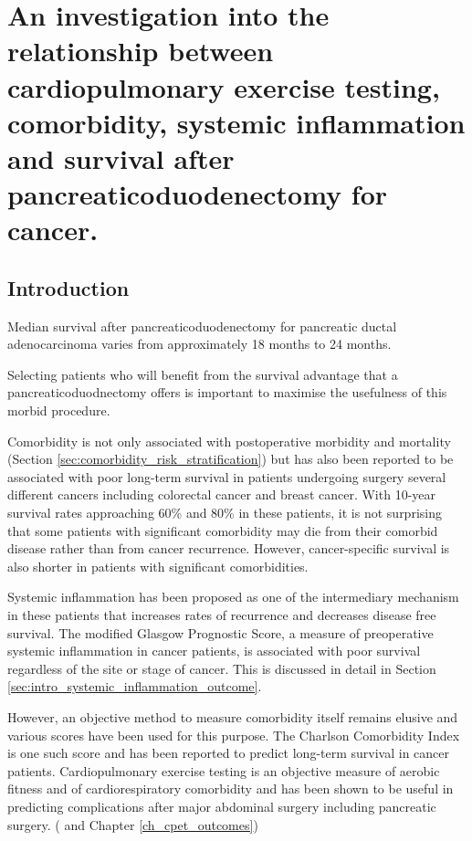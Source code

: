 
\chapter{An investigation into the relationship between cardiopulmonary exercise testing, comorbidity, systemic inflammation and survival after pancreaticoduodenectomy for cancer.}
\label{ch_survival}


\clearpage

\section{Introduction}
Median survival after pancreaticoduodenectomy for pancreatic ductal adenocarcinoma varies from approximately 18 months to 24 months.\parencite{winter_1423_2006,neoptolemos_adjuvant_2010} 

Selecting patients who will benefit from the survival advantage that a pancreaticoduodnectomy offers is important to maximise the usefulness of this morbid procedure.

Comorbidity is not only associated with postoperative morbidity and mortality (Section \ref{sec:comorbidity_risk_stratification}) but has also been reported to be associated with poor long-term survival in patients undergoing surgery several different cancers including colorectal cancer \parencite{} and breast cancer.\parencite{} With 10-year survival rates approaching 60\% and 80\% in these patients, it is not surprising that some patients with significant comorbidity may die from their comorbid disease rather than from cancer recurrence. However, cancer-specific survival is also shorter in patients with significant comorbidities.

Systemic inflammation has been proposed as one of the intermediary mechanism in these patients that increases rates of recurrence and decreases disease free survival. The modified Glasgow Prognostic Score, a measure of preoperative systemic inflammation in cancer patients, is associated with poor survival regardless of the site or stage of cancer. This is discussed in detail in Section \ref{sec:intro_systemic_inflammation_outcome}. 

However, an objective method to measure comorbidity itself remains elusive and various scores have been used for this purpose. The Charlson Comorbidity Index is one such score and has been reported to predict long-term survival in cancer patients. Cardiopulmonary exercise testing is an objective measure of aerobic fitness and of cardiorespiratory comorbidity and has been shown to be useful in predicting complications after major abdominal surgery including pancreatic surgery. (\parencite{ausania_effects_2012} and Chapter \ref{ch_cpet_outcomes})

